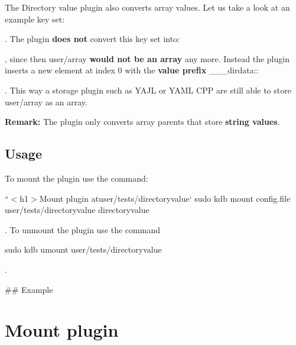 The Directory value plugin also converts array values. Let us take a look at an example key set\+:




. The plugin {\bfseries does not} convert this key set into\+:




, since then {\ttfamily user/array} {\bfseries would not be an array} any more. Instead the plugin inserts a new element at index 0 with the {\bfseries value prefix} {\ttfamily \+\_\+\+\_\+\+\_\+dirdata\+:}\+:




. This way a storage plugin such as Y\+A\+JL or Y\+A\+ML C\+PP are still able to store {\ttfamily user/array} as an array.

{\bfseries Remark\+:} The plugin only converts array parents that store {\bfseries string values}.

\subsection*{Usage}

To mount the plugin use the command\+:

``{\ttfamily  $<$h1$>$Mount plugin at}user/tests/directoryvalue` sudo kdb mount config.\+file user/tests/directoryvalue directoryvalue 
\begin{DoxyCode}
. To unmount the plugin use the command
\end{DoxyCode}
 sudo kdb umount user/tests/directoryvalue 
\begin{DoxyCode}
.

## Example
\end{DoxyCode}
 \section*{Mount plugin}

